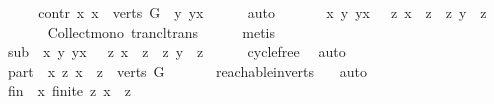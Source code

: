 \begin{isabellebody}
\ \ \isamarkupfalse%
\ \isamarkupfalse%
\ contr{\isacharcolon}{\kern0pt}\ {\isachardoublequoteopen}{\isasymforall}x{\isachardot}{\kern0pt}\ x\ {\isasymin}\ verts\ G\ {\isasymlongrightarrow}\ {\isacharparenleft}{\kern0pt}{\isasymexists}y{\isachardot}{\kern0pt}\ y{\isasymrightarrow}\isactrlsup {\isacharplus}{\kern0pt}x{\isacharparenright}{\kern0pt}{\isachardoublequoteclose}\isanewline
\ \ \ \ \isamarkupfalse%
\ auto\ \ \isanewline
\ \ \isamarkupfalse%
\ {\isachardoublequoteopen}{\isasymforall}\ x\ y{\isachardot}{\kern0pt}\ y{\isasymrightarrow}\isactrlsup {\isacharplus}{\kern0pt}x\ {\isasymlongrightarrow}\ \ {\isacharbraceleft}{\kern0pt}z{\isachardot}{\kern0pt}\ x\ {\isasymrightarrow}\isactrlsup {\isacharplus}{\kern0pt}\ z{\isacharbraceright}{\kern0pt}\ {\isasymsubseteq}\ {\isacharbraceleft}{\kern0pt}z{\isachardot}{\kern0pt}\ y\ {\isasymrightarrow}\isactrlsup {\isacharplus}{\kern0pt}\ z{\isacharbraceright}{\kern0pt}{\isachardoublequoteclose}\isanewline
\ \ \ \ \isamarkupfalse%
\ \ Collect{\isacharunderscore}{\kern0pt}mono\ trancl{\isacharunderscore}{\kern0pt}trans\isanewline
\ \ \ \ \isamarkupfalse%
\ metis\isanewline
\ \ \isamarkupfalse%
\ \isamarkupfalse%
\ sub{\isacharcolon}{\kern0pt}\ {\isachardoublequoteopen}{\isasymforall}\ x\ y{\isachardot}{\kern0pt}\ y{\isasymrightarrow}\isactrlsup {\isacharplus}{\kern0pt}x\ {\isasymlongrightarrow}\ \ {\isacharbraceleft}{\kern0pt}z{\isachardot}{\kern0pt}\ x\ {\isasymrightarrow}\isactrlsup {\isacharplus}{\kern0pt}\ z{\isacharbraceright}{\kern0pt}\ {\isasymsubset}\ {\isacharbraceleft}{\kern0pt}z{\isachardot}{\kern0pt}\ y\ {\isasymrightarrow}\isactrlsup {\isacharplus}{\kern0pt}\ z{\isacharbraceright}{\kern0pt}{\isachardoublequoteclose}\isanewline
\ \ \ \ \isamarkupfalse%
\ cycle{\isacharunderscore}{\kern0pt}free\ \isamarkupfalse%
\ auto\isanewline
\ \ \isamarkupfalse%
\ part{\isacharcolon}{\kern0pt}\ {\isachardoublequoteopen}{\isasymforall}\ x{\isachardot}{\kern0pt}\ {\isacharbraceleft}{\kern0pt}z{\isachardot}{\kern0pt}\ x\ {\isasymrightarrow}\isactrlsup {\isacharplus}{\kern0pt}\ z{\isacharbraceright}{\kern0pt}\ {\isasymsubseteq}\ verts\ G{\isachardoublequoteclose}\ \isanewline
\ \ \ \ \isamarkupfalse%
\ reachable{}{\isacharunderscore}{\kern0pt}in{\isacharunderscore}{\kern0pt}verts\ \ \isamarkupfalse%
\ auto\isanewline
\ \ \isamarkupfalse%
\ \isamarkupfalse%
\ fin{\isacharcolon}{\kern0pt}\ {\isachardoublequoteopen}{\isasymforall}\ x{\isachardot}{\kern0pt}\ finite\ {\isacharbraceleft}{\kern0pt}z{\isachardot}{\kern0pt}\ x\ {\isasymrightarrow}\isactrlsup {\isacharplus}{\kern0pt}\ z{\isacharbraceright}{\kern0pt}{\isachardoublequoteclose}\isanewline

\end{isabellebody}
